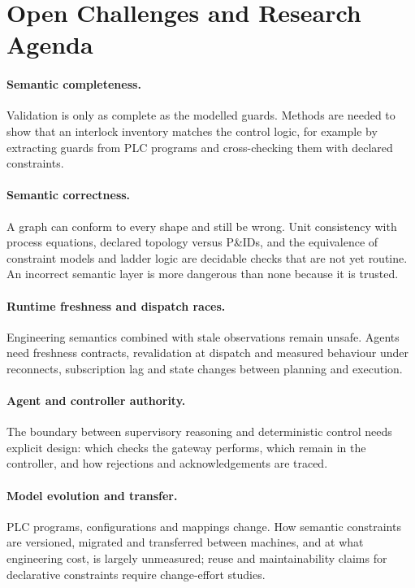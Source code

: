 \section{Open Challenges and Research Agenda}
\label{sec:challenges}

\paragraph{Semantic completeness.} Validation is only as complete as the modelled guards.
Methods are needed to show that an interlock inventory matches the control logic, for
example by extracting guards from PLC programs and cross-checking them with declared
constraints.

\paragraph{Semantic correctness.} A graph can conform to every shape and still be wrong.
Unit consistency with process equations, declared topology versus P\&IDs, and the
equivalence of constraint models and ladder logic are decidable checks that are not yet
routine. An incorrect semantic layer is more dangerous than none because it is trusted.

\paragraph{Runtime freshness and dispatch races.} Engineering semantics combined with stale
observations remain unsafe. Agents need freshness contracts, revalidation at dispatch and
measured behaviour under reconnects, subscription lag and state changes between planning
and execution.

\paragraph{Agent and controller authority.} The boundary between supervisory reasoning and
deterministic control needs explicit design: which checks the gateway performs, which remain
in the controller, and how rejections and acknowledgements are traced.

\paragraph{Model evolution and transfer.} PLC programs, configurations and mappings change.
How semantic constraints are versioned, migrated and transferred between machines, and at
what engineering cost, is largely unmeasured; reuse and maintainability claims for
declarative constraints require change-effort studies.

